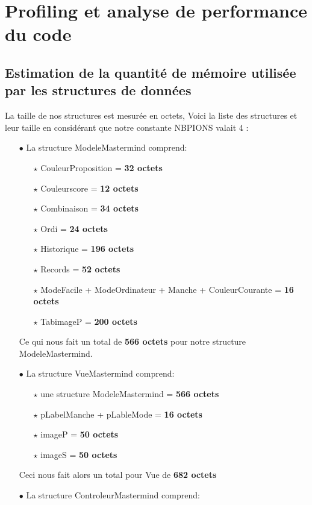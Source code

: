 \documentclass[a4paper, 11pt, oneside]{article}
\begin{document}
\newpage
\section{Profiling et analyse de performance du code}
\subsection{Estimation de la quantité de mémoire utilisée par les structures de données}
La taille de nos structures est mesurée en octets,
Voici la liste des structures et leur taille en considérant que notre constante NB\textunderscore PIONS valait 4 :
\begin{itemize}
    \item[$\bullet$] La structure ModeleMastermind comprend:
\begin{itemize}
        \item[$\star$] CouleurProposition = \textbf{32 octets}
        \item[$\star$] Couleurscore = \textbf{12 octets}
        \item[$\star$] Combinaison = \textbf{34 octets}
        \item[$\star$] Ordi = \textbf{24 octets}
        \item[$\star$] Historique = \textbf{196 octets}
        \item[$\star$] Records = \textbf{52 octets}
        \item[$\star$] ModeFacile + ModeOrdinateur + Manche + CouleurCourante = \textbf{16 octets} 
        \item[$\star$] Tab\textunderscore imageP = \textbf{200 octets}
    \end{itemize}
    Ce qui nous fait un total de \textbf{566 octets} pour notre structure ModeleMastermind.
    \item[$\bullet$] La structure VueMastermind comprend:
    \begin{itemize}
        \item[$\star$] une structure ModeleMastermind = \textbf{566 octets}
        \item[$\star$] pLabelManche + pLableMode = \textbf{16 octets}
        \item[$\star$] imageP = \textbf{50 octets}
        \item[$\star$] imageS = \textbf{50 octets}
    \end{itemize}
    Ceci nous fait alors un total pour Vue de \textbf{682 octets}
     \item[$\bullet$]La structure ControleurMastermind comprend:

\end{itemize}
\end{document}
